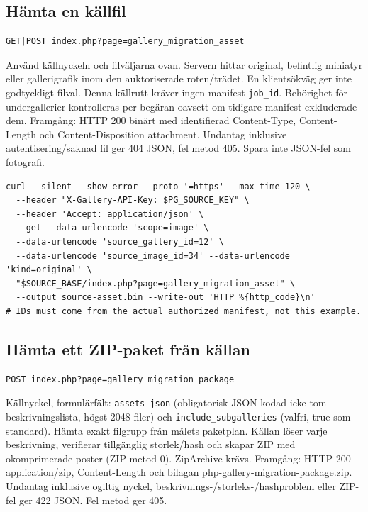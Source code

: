 \documentclass[11pt,a4paper]{article}
\newcommand{\codeword}[1]{\nolinkurl{#1}}
\begin{document}
\subsection{\texorpdfstring{Hämta en källfil}{Hämta en källfil}}

\label{api352:migration-asset}

\begin{lstlisting}[language={}]
GET|POST index.php?page=gallery_migration_asset
\end{lstlisting}

Använd källnyckeln och filväljarna ovan. Servern hittar original, befintlig miniatyr eller
gallerigrafik inom den auktoriserade roten/trädet. En klientsökväg ger inte godtyckligt
filval. Denna källrutt kräver ingen manifest-\codeword{job_id}. Behörighet för
undergallerier kontrolleras per begäran oavsett om tidigare manifest exkluderade dem.
Framgång: HTTP 200 binärt med identifierad Content-Type, Content-Length och
Content-Disposition attachment. Undantag inklusive autentisering/saknad fil ger 404 JSON,
fel metod 405. Spara inte JSON-fel som fotografi.

\begin{lstlisting}[language={}]
curl --silent --show-error --proto '=https' --max-time 120 \
  --header "X-Gallery-API-Key: $PG_SOURCE_KEY" \
  --header 'Accept: application/json' \
  --get --data-urlencode 'scope=image' \
  --data-urlencode 'source_gallery_id=12' \
  --data-urlencode 'source_image_id=34' --data-urlencode 'kind=original' \
  "$SOURCE_BASE/index.php?page=gallery_migration_asset" \
  --output source-asset.bin --write-out 'HTTP %{http_code}\n'
# IDs must come from the actual authorized manifest, not this example.
\end{lstlisting}

\subsection{\texorpdfstring{Hämta ett ZIP-paket från källan}{Hämta ett ZIP-paket från källan}}

\label{api352:migration-package}

\begin{lstlisting}[language={}]
POST index.php?page=gallery_migration_package
\end{lstlisting}

Källnyckel, formulärfält: \codeword{assets_json} (obligatorisk JSON-kodad icke-tom
beskrivningslista, högst 2048 filer) och \codeword{include_subgalleries} (valfri, true som
standard). Hämta exakt filgrupp från målets paketplan. Källan löser varje beskrivning,
verifierar tillgänglig storlek/hash och skapar ZIP med okomprimerade poster (ZIP-metod 0).
ZipArchive krävs. Framgång: HTTP 200 application/zip, Content-Length och bilagan
php-gallery-migration-package.zip. Undantag inklusive ogiltig nyckel,
beskrivnings-/storleks-/hashproblem eller ZIP-fel ger 422 JSON. Fel metod ger 405.
\end{document}
